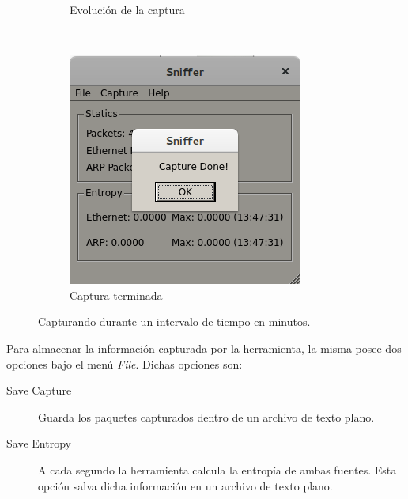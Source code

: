 \begin{figure}[h!]
\begin{subfigure}[b]{0.3\textwidth}
                \caption{Evolución de la captura}
        \end{subfigure}
        ~ %
        \begin{subfigure}[b]{0.3\textwidth}
                \includegraphics[width=\textwidth]{graficos/tool/tool_done}
                \caption{Captura terminada}
        \end{subfigure}
        \caption{Capturando durante un intervalo de tiempo en minutos.}\label{fig:interval}
\end{figure}

Para almacenar la información capturada por la herramienta, la misma posee dos opciones bajo el menú \emph{File}. Dichas opciones son:

\begin{description}
	\item[Save Capture]	Guarda los paquetes capturados dentro de un archivo de texto plano.
	\item[Save Entropy] A cada segundo la herramienta calcula la entropía de ambas fuentes. Esta opción salva dicha información en un archivo de texto plano.
\end{description}

